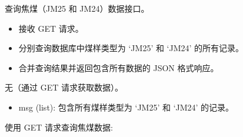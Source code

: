 \documentclass[a4paper,12pt,english]{sphinxmanual}
\begin{document}
\begin{fulllineitems}
\label{\detokenize{api/login:login.getJiaoCoalData}}
\pysigstartsignatures
{}
\pysigstopsignatures
\sphinxAtStartPar
查询焦煤（JM25 和 JM24）数据接口。
\begin{description}
\begin{itemize}
\item {} 
\sphinxAtStartPar
接收 GET 请求。

\item {} 
\sphinxAtStartPar
分别查询数据库中煤样类型为 ‘JM25’ 和 ‘JM24’ 的所有记录。

\item {} 
\sphinxAtStartPar
合并查询结果并返回包含所有数据的 JSON 格式响应。

\end{itemize}

\sphinxAtStartPar
无（通过 GET 请求获取数据）。

\begin{description}
\begin{itemize}
\item {} 
\sphinxAtStartPar
msg (list): 包含所有煤样类型为 ‘JM25’ 和 ‘JM24’ 的记录。

\end{itemize}

\end{description}

\sphinxAtStartPar
使用 GET 请求查询焦煤数据:

\begin{sphinxVerbatim}[commandchars=\\\{\}]
 


\end{sphinxVerbatim}
\end{description}
\end{fulllineitems}
\end{document}
